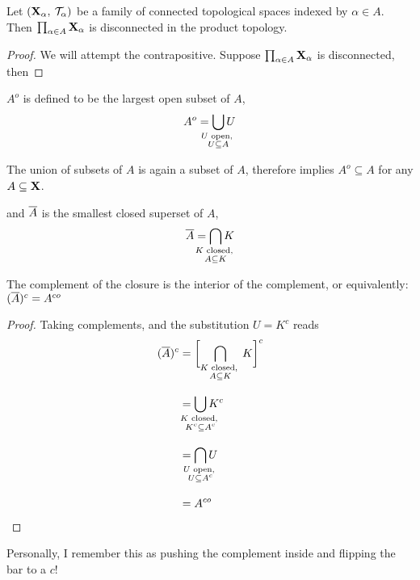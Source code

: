 \documentclass[../main-manifolds.tex]{subfiles}
\begin{document}
\begin{wts}
    Let $({\mathbf{X}}_\alpha,\: \mathcal{T}_{\alpha})$ be a family of connected topological spaces indexed by $\alpha\in A$. Then $\prod_{\alpha\in A}{\mathbf{X}}_\alpha$ is disconnected in the product topology.
\end{wts}
\begin{proof}
    We will attempt the contrapositive. Suppose $\prod_{\alpha\in A}{\mathbf{X}}_\alpha$ is disconnected, then
\end{proof}



\begin{definition}\label{chp4:interior-definition}
    $A^o$ is defined to be the largest open subset of $A$, 
    \[
        A^o = \bigcup_{\mathclap{\substack{\text{$U$ open, }\\ U\subseteq A}}} U
    \]
\end{definition}
\begin{corollary}\label{chp4:interior-subset}
    The union of subsets of $A$ is again a subset of $A$, therefore  implies $A^o\subseteq A$ for any $A\subseteq {\mathbf{X}}$. 
\end{corollary}


\begin{definition}\label{chp4:closure-definition}
    and $\overline{A}$ is the smallest closed superset of $A$,
    \[
        \cl{A} = \bigcap_{\mathclap{\substack{\text{$K$ closed, }\\ A\subseteq K}}} K
    \]
\end{definition}


\begin{wts}\label{chp4:flipping-interior-to-closure}
    The complement of the closure is the interior of the complement, or equivalently: $(\overline{A})^c = A^{co}$
\end{wts}
\begin{proof}
    Taking complements, and the substitution $U = K^c$ reads
    \begin{align*}
        (\cl{A})^c &= \biggl[\bigcap_{{\substack{\text{$K$ closed, }\\ A\subseteq K}}} K \biggr]^c\\[2ex]
        &= \bigcup_{\mathclap{\substack{\text{$K$ closed, }\\ K^c\subseteq A^c}}} K^c\\[2ex]
        &= \bigcap_{\mathclap{\substack{\text{$U$ open, }\\ U\subseteq A^c}}} U\\[2ex]
        &= A^{co}
    \end{align*}
\end{proof}
\begin{remark}
    Personally, I remember this as pushing the complement inside and flipping the bar to a $c$!
\end{remark}
\end{document}
